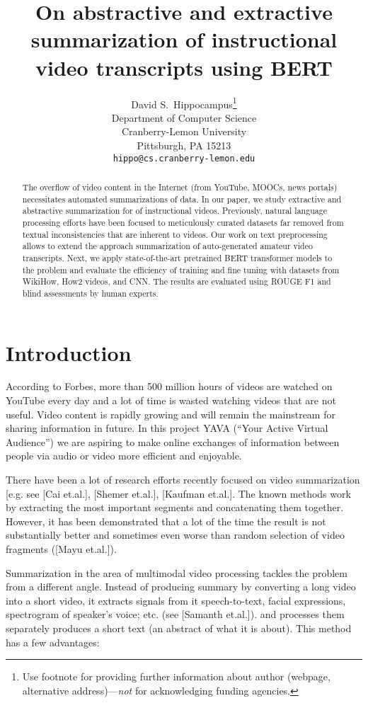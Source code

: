 \documentclass{article}
\title{On abstractive and extractive summarization of instructional video transcripts using BERT}
\author{%
  David S.~Hippocampus\thanks{Use footnote for providing further information
    about author (webpage, alternative address)---\emph{not} for acknowledging
    funding agencies.} \\
  Department of Computer Science\\
  Cranberry-Lemon University\\
  Pittsburgh, PA 15213 \\
  \texttt{hippo@cs.cranberry-lemon.edu} \\
}
\begin{document}
\maketitle

\begin{abstract}
The overflow of video content in the Internet (from YouTube, MOOCs, news portals) necessitates automated summarizations of data. In our paper, we study extractive and abstractive summarization for of instructional videos. Previously, natural language processing efforts have been focused to meticulously curated datasets far removed from textual inconsistencies that are inherent to videos. Our work on text preprocessing allows to extend the approach summarization of auto-generated amateur video transcripts. Next, we apply state-of-the-art pretrained BERT transformer models to the problem and evaluate the efficiency of  training and fine tuning with datasets from WikiHow, How2 videos, and CNN. The results are evaluated using ROUGE F1 and blind assessments by human experts.

\end{abstract}

\section{Introduction}
 

According to Forbes, more than 500 million hours of videos are watched on YouTube every day and a lot of time is wasted watching videos that are not useful. Video content is rapidly growing and will remain the mainstream for sharing information in future. In this project YAVA (“Your Active Virtual Audience”) we are aspiring to make online exchanges of information between people via audio or video more efficient and enjoyable. 

There have been a lot of research efforts recently focused on video summarization [e.g. see [Cai et.al.], [Shemer et.al.], [Kaufman et.al.]. The known methods work by extracting the most important segments and concatenating them together. However, it has been demonstrated that a lot of the time the result is not substantially better and sometimes even worse than random selection of video fragments ([Mayu et.al.]). 

Summarization in the area of multimodal video processing tackles the problem from a different angle. Instead of producing summary by converting a long video into a short video, it extracts signals from it speech-to-text, facial expressions, spectrogram of speaker’s voice; etc. (see [Samanth et.al.]). and processes them separately produces a short text (an abstract of what it is about). This method has a few advantages:
\end{document}
